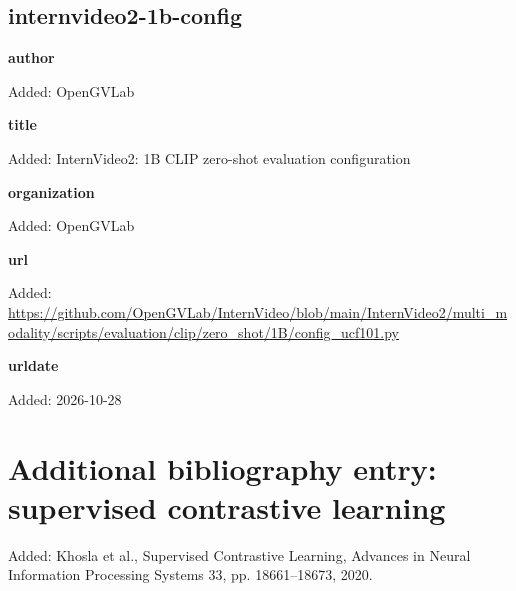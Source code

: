 \subsection*{internvideo2-1b-config}
\noindent{}\par
\noindent\textbf{author}\par
{\color{AuditGreen}Added: OpenGVLab\par}
\noindent\textbf{title}\par
{\color{AuditGreen}Added: InternVideo2: 1B CLIP zero-shot evaluation configuration\par}
\noindent\textbf{organization}\par
{\color{AuditGreen}Added: OpenGVLab\par}
\noindent\textbf{url}\par
{\color{AuditGreen}Added: \url{https://github.com/OpenGVLab/InternVideo/blob/main/InternVideo2/multi_modality/scripts/evaluation/clip/zero_shot/1B/config_ucf101.py}\par}
\noindent\textbf{urldate}\par
{\color{AuditGreen}Added: 2026-10-28\par}
\medskip
\endgroup

\section*{Additional bibliography entry: supervised contrastive learning}
{\color{AuditGreen}Added: Khosla et al., Supervised Contrastive Learning, Advances in Neural Information Processing Systems 33, pp. 18661--18673, 2020.}
